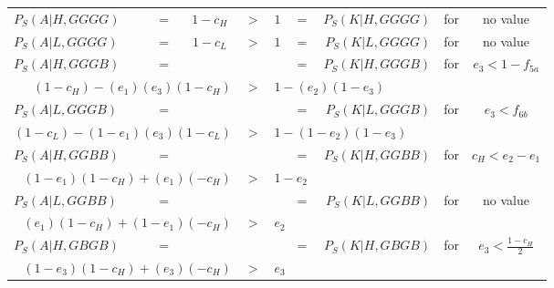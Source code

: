 \documentclass[a4paper,12pt]{article}
\numberwithin{equation}{section}
\begin{document}
\begin{table}[h]
\setlength{\tabcolsep}{.3em}
\begin{center}
\begin{tabular}{lcccccrcc}
$P_{S}(A|H,GGGG)$ & $=$ & $1-c_{H}$ & $>$ & $1$ & = & $P_{S}(K|H,GGGG)$ & for & no value\\
$P_{S}(A|L,GGGG)$ & $=$ & $1-c_{L}$ & $>$ & $1$ & = & $P_{S}(K|L,GGGG)$ & for & no value\\
$P_{S}(A|H,GGGB)$ & $=$ & \hspace{20mm} & & \hspace{10mm} & $=$ & $P_{S}(K|H,GGGB)$ & \multirow{2}{*}{for} & \multirow{2}{*}{$e_{3}<1-f_{5a}$}
\vspace{-1mm}\\
\multicolumn{3}{r}{$(1-c_{H})-(e_{1})(e_{3})(1-c_{H})$} & $>$ & \multicolumn{3}{l}{$1-(e_{2})(1-e_{3})$} &
\vspace{1mm}\\
$P_{S}(A|L,GGGB)$ & $=$ & & & & $=$ & $P_{S}(K|L,GGGB)$ & \multirow{2}{*}{for} & \multirow{2}{*}{$e_{3}<f_{6b}$}
\vspace{-1mm}\\
\multicolumn{3}{r}{$(1-c_{L})-(1-e_{1})(e_{3})(1-c_{L})$} & $>$ & \multicolumn{3}{l}{$1-(1-e_{2})(1-e_{3})$} &
\vspace{1mm}\\
$P_{S}(A|H,GGBB)$ & $=$ & & & & $=$ & $P_{S}(K|H,GGBB)$ & \multirow{2}{*}{for} & \multirow{2}{*}{$c_{H}<e_{2}-e_{1}$}
\vspace{-1mm}\\
\multicolumn{3}{r}{$(1-e_{1})(1-c_{H})+(e_{1})(-c_{H})$} & $>$ & \multicolumn{3}{l}{$1-e_{2}$} &
\vspace{1mm}\\
$P_{S}(A|L,GGBB)$ & $=$ & & & & $=$ & $P_{S}(K|L,GGBB)$ & \multirow{2}{*}{for} & \multirow{2}{*}{no value}
\vspace{-1mm}\\
\multicolumn{3}{r}{$(e_{1})(1-c_{H})+(1-e_{1})(-c_{H})$} & $>$ & \multicolumn{3}{l}{$e_{2}$} &
\vspace{1mm}\\
$P_{S}(A|H,GBGB)$ & $=$ & & & & $=$ & $P_{S}(K|H,GBGB)$ & \multirow{2}{*}{for} & \multirow{2}{*}{$e_{3}<\frac{1-c_{H}}{2}$}
\vspace{-1mm}\\
\multicolumn{3}{r}{$(1-e_{3})(1-c_{H})+(e_{3})(-c_{H})$} & $>$ & \multicolumn{3}{l}{$e_{3}$} &
\vspace{1mm}\\

\end{tabular}
\end{center}
\end{table}
\end{document}
